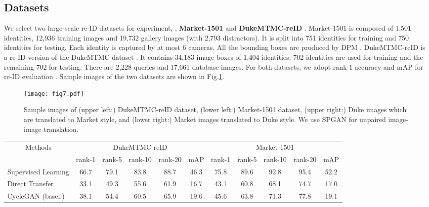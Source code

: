 \documentclass[10pt,twocolumn,letterpaper]{article}
\begin{document}
{\subsection{Datasets}
We select two large-scale re-ID datasets for experiment, \ie, \textbf{Market-1501} \cite{DBLP:conf/iccv/ZhengSTWWT15} and \textbf{DukeMTMC-reID} \cite{ristani2016MTMC,zheng2017unlabeled}.  Market-1501  is composed of 1,501 identities, 12,936 training images and 19,732 gallery images (with 2,793 distractors). It is split into 751 identities for training and 750 identities for testing. Each identity is captured by at most 6 cameras. All the bounding boxes are produced by DPM \cite{felzenszwalb2008discriminatively}.  DukeMTMC-reID is a re-ID version of the DukeMTMC dataset \cite{ristani2016MTMC}. 
It contains 34,183 image boxes of 1,404 identities: 702 identities are used for training and the remaining 702 for testing. There are 2,228 queries and 17,661 database images. For both datasets, we adopt rank-1 accuracy and mAP for re-ID evaluation \cite{DBLP:conf/iccv/ZhengSTWWT15}. Sample images of the two datasets are shown in Fig.\ref{fig:sample_images}.
\begin{figure}[t]
\setlength{\abovecaptionskip}{-0.1cm} 
\setlength{\belowcaptionskip}{-0.3cm}
\begin{center}
\texttt{[image: fig7.pdf]}
\end{center}
\caption{Sample images of (upper left:) DukeMTMC-reID dataset, (lower left:) Market-1501 dataset, (upper right:) Duke images which are translated to Market style, and (lower right:) Market images translated to Duke style. We use SPGAN for unpaired image-image translation.}
\label{fig:sample_images}
\end{figure}
\setlength{\tabcolsep}{5pt}
\begin{table*}[t]
\begin{center}
\begin{tabular}{l|ccccc|ccccc}
\hline
\multicolumn{1}{c|}{\multirow{2}{*}{Methods}}&\multicolumn{5}{c|}{DukeMTMC-reID}&\multicolumn{5}{c}{Market-1501}\\
\cline{2-11}
\multicolumn{1}{c|}{}&rank-1&rank-5&rank-10&rank-20&mAP&rank-1&rank-5&rank-10&rank-20&mAP\\
\hline
\hline
Supervised Learning &66.7&79.1 &83.8 & 88.7&46.3&75.8&89.6&92.8&95.4&52.2\\
\hline
Direct Transfer &33.1&49.3&55.6 &61.9&16.7 &43.1&60.8&68.1&74.7&17.0\\
CycleGAN (basel.) &38.1&54.4&60.5&65.9&19.6&45.6 & 63.8&71.3 &77.8&19.1 \\

\end{tabular}
\end{center}
\end{table*}}
\end{document}
